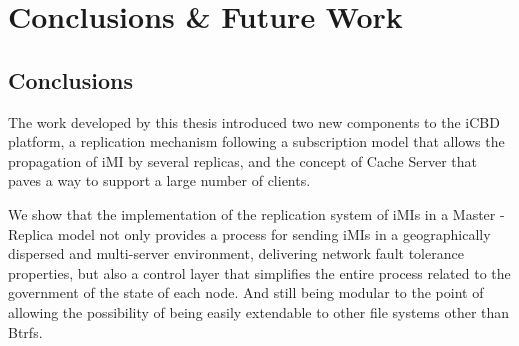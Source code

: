 \chapter{Conclusions \& Future Work}
\label{cha:conclusion}

\section{Conclusions}
\label{sec:con_conclusions}



The work developed by this thesis introduced two new components to the iCBD platform, a replication mechanism following a subscription model that allows the propagation of iMI by several replicas, and the concept of Cache Server that paves a way to support a large number of clients.

We show that the implementation of the replication system of iMIs in a Master - Replica model not only provides a process for sending iMIs in a geographically dispersed and multi-server environment, delivering network fault tolerance properties, but also a control layer that simplifies the entire process related to the government of the state of each node. And still being modular to the point of allowing the possibility of being easily extendable to other file systems other than Btrfs.

